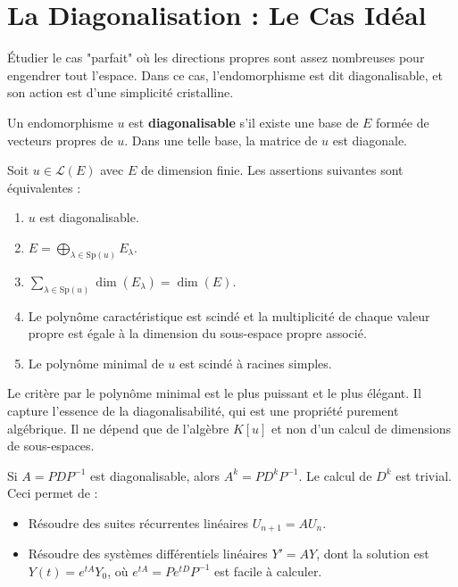 \section{La Diagonalisation : Le Cas Idéal}

\begin{objectif}
    Étudier le cas "parfait" où les directions propres sont assez nombreuses pour engendrer tout l'espace. Dans ce cas, l'endomorphisme est dit diagonalisable, et son action est d'une simplicité cristalline.
\end{objectif}

\begin{definition}
    Un endomorphisme $u$ est \textbf{diagonalisable} s'il existe une base de $E$ formée de vecteurs propres de $u$. Dans une telle base, la matrice de $u$ est diagonale.
\end{definition}

\begin{theorem}
    Soit $u \in \mathcal{L}(E)$ avec $E$ de dimension finie. Les assertions suivantes sont équivalentes :
    \begin{enumerate}
        \item $u$ est diagonalisable.
        \item $E = \bigoplus_{\lambda \in \mathrm{Sp}(u)} E_\lambda$.
        \item $\sum_{\lambda \in \mathrm{Sp}(u)} \dim(E_\lambda) = \dim(E)$.
        \item Le polynôme caractéristique est scindé et la multiplicité de chaque valeur propre est égale à la dimension du sous-espace propre associé.
        \item Le polynôme minimal de $u$ est scindé à racines simples.
    \end{enumerate}
\end{theorem}
\begin{remark}
    Le critère par le polynôme minimal est le plus puissant et le plus élégant. Il capture l'essence de la diagonalisabilité, qui est une propriété purement algébrique. Il ne dépend que de l'algèbre $K[u]$ et non d'un calcul de dimensions de sous-espaces.
\end{remark}

\begin{application}
    Si $A=PDP^{-1}$ est diagonalisable, alors $A^k = PD^k P^{-1}$. Le calcul de $D^k$ est trivial. Ceci permet de :
    \begin{itemize}
        \item Résoudre des suites récurrentes linéaires $U_{n+1} = AU_n$.
        \item Résoudre des systèmes différentiels linéaires $Y' = AY$, dont la solution est $Y(t) = e^{tA}Y_0$, où $e^{tA} = P e^{tD} P^{-1}$ est facile à calculer.
    \end{itemize}
\end{application}

